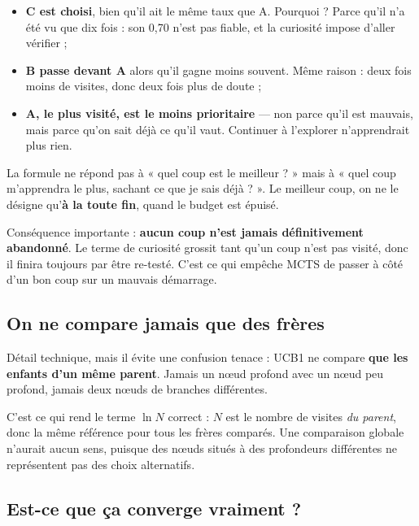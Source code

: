 \begin{itemize}
  \item \textbf{C est choisi}, bien qu'il ait le même taux que A. Pourquoi ?
        Parce qu'il n'a été vu que dix fois : son 0,70 n'est pas fiable, et la
        curiosité impose d'aller vérifier ;
  \item \textbf{B passe devant A} alors qu'il gagne moins souvent. Même
        raison : deux fois moins de visites, donc deux fois plus de doute ;
  \item \textbf{A, le plus visité, est le moins prioritaire} — non parce qu'il
        est mauvais, mais parce qu'on sait déjà ce qu'il vaut. Continuer à
        l'explorer n'apprendrait plus rien.
\end{itemize}

\begin{nkretenir}
La formule ne répond pas à « quel coup est le meilleur ? » mais à « quel coup
m'apprendra le plus, sachant ce que je sais déjà ? ». Le meilleur coup, on ne
le désigne qu'\textbf{à la toute fin}, quand le budget est épuisé.

Conséquence importante : \textbf{aucun coup n'est jamais définitivement
abandonné}. Le terme de curiosité grossit tant qu'un coup n'est pas visité,
donc il finira toujours par être re-testé. C'est ce qui empêche MCTS de passer
à côté d'un bon coup sur un mauvais démarrage.
\end{nkretenir}

\subsection{On ne compare jamais que des frères}

Détail technique, mais il évite une confusion tenace : UCB1 ne compare
\textbf{que les enfants d'un même parent}. Jamais un nœud profond avec un nœud
peu profond, jamais deux nœuds de branches différentes.

C'est ce qui rend le terme $\ln N$ correct : $N$ est le nombre de visites
\emph{du parent}, donc la même référence pour tous les frères comparés. Une
comparaison globale n'aurait aucun sens, puisque des nœuds situés à des
profondeurs différentes ne représentent pas des choix alternatifs.

\subsection{Est-ce que ça converge vraiment ?}

